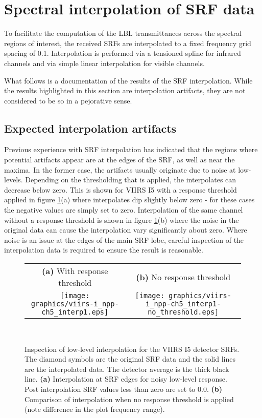 \newpage
\section{Spectral interpolation of SRF data}
To facilitate the computation of the LBL transmittances across the spectral regions of interest, the received SRFs are interpolated to a fixed frequency grid spacing of 0.1\invcm{}. Interpolation is performed via a tensioned spline for infrared channels and via simple linear interpolation for visible channels.

What follows is a documentation of the results of the SRF interpolation. While the results highlighted in this section are interpolation artifacts, they are not considered to be so in a pejorative sense.

\subsection{Expected interpolation artifacts}
Previous experience with SRF interpolation has indicated that the regions where potential artifacts appear are at the edges of the SRF, as well as near the maxima. In the former case, the artifacts usually originate due to noise at low-levels. Depending on the thresholding that is applied, the interpolates can decrease below zero. This is shown for VIIRS I5 with a response threshold applied in figure \ref{fig:low_level_interp}(a) where interpolates dip slightly below zero - for these cases the negative values are simply set to zero. Interpolation of the same channel without a response threshold is shown in figure \ref{fig:low_level_interp}(b) where the noise in the original data can cause the interpolation vary significantly about zero. Where noise is an issue at the edges of the main SRF lobe, careful inspection of the interpolation data is required to ensure the result is reasonable. 

\begin{figure}[H]
  \centering
  \begin{tabular}{c c}
    \textsf{\textbf{(a)} With response threshold} &
    \textsf{\textbf{(b)} No response threshold} \\
    \texttt{[image: graphics/viirs-i\_npp-ch5\_interp1.eps]} &
    \texttt{[image: graphics/viirs-i\_npp-ch5\_interp1-no\_threshold.eps]} 
  \end{tabular} \\
  \caption{Inspection of low-level interpolation for the VIIRS I5 detector SRFs. The diamond symbols are the original SRF data and the solid lines are the interpolated data. The detector average is the thick black line. \textbf{(a)} Interpolation at SRF edges for noisy low-level response. Post interpolation SRF values less than zero are set to 0.0. \textbf{(b)} Comparison of interpolation when no response threshold is applied (note difference in the plot frequency range).}
  \label{fig:low_level_interp}
\end{figure}

